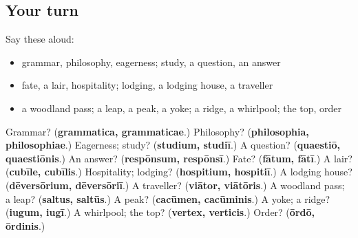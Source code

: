 \subsection*{Your turn}
Say these aloud:

\begin{itemize}
\raggedright
  \item grammar, philosophy, eagerness; study, a question, an answer
  \item fate, a lair, hospitality; lodging, a lodging house, a traveller
  \item a woodland pass; a leap, a peak, a yoke; a ridge, a whirlpool; the top, order
\end{itemize}

\begin{tcolorbox}[breakable,colback=teal!4,colframe=teal!35!black,title={Before you move on}]
Grammar? (\textbf{grammatica, grammaticae}.) Philosophy? (\textbf{philosophia, philosophiae}.) Eagerness; study? (\textbf{studium, studiī}.) A question? (\textbf{quaestiō, quaestiōnis}.) An answer? (\textbf{respōnsum, respōnsī}.) Fate? (\textbf{fātum, fātī}.) A lair? (\textbf{cubīle, cubīlis}.) Hospitality; lodging? (\textbf{hospitium, hospitiī}.) A lodging house? (\textbf{dēversōrium, dēversōriī}.) A traveller? (\textbf{viātor, viātōris}.) A woodland pass; a leap? (\textbf{saltus, saltūs}.) A peak? (\textbf{cacūmen, cacūminis}.) A yoke; a ridge? (\textbf{iugum, iugī}.) A whirlpool; the top? (\textbf{vertex, verticis}.) Order? (\textbf{ōrdō, ōrdinis}.)
\end{tcolorbox}
